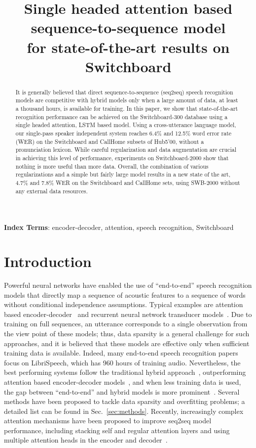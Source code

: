 \documentclass[a4paper]{article}
\title{Single headed attention based sequence-to-sequence model \\ for state-of-the-art results on Switchboard}
\begin{document}
\renewcommand{\baselinestretch}{0.933}\normalsize
\maketitle


\begin{abstract}
It is generally believed that direct sequence-to-sequence (seq2seq) speech recognition models are competitive with hybrid models only when a large amount of data, at least a thousand hours, is available for training.
In this paper, we show that state-of-the-art recognition performance can be achieved on the Switchboard-300 database using a single headed attention, LSTM based model.
Using a cross-utterance language model, our single-pass speaker independent system reaches 6.4\% and 12.5\% word error rate (WER) on the Switchboard and CallHome subsets of Hub5'00, without a pronunciation lexicon.
While careful regularization and data augmentation are crucial in achieving this level of performance, experiments on Switchboard-2000 show that nothing is more useful than more data.
Overall, the combination of various regularizations and a simple but fairly large model results in a new state of the art, 4.7\% and 7.8\% WER on the Switchboard and CallHome sets, using SWB-2000 without any external data resources.


\end{abstract}
\noindent\textbf{Index Terms}: encoder-decoder, attention, speech recognition, Switchboard




\section{Introduction}
\label{sec:intro}
Powerful neural networks have enabled the use of ``end-to-end'' speech recognition models that directly map a sequence of acoustic features to a sequence of words without conditional independence assumptions.
Typical examples are attention based encoder-decoder~\cite{Bahdanau2015} and recurrent neural network transducer models~\cite{Graves2012}.
Due to training on full sequences, an utterance corresponds to a single observation from the view point of these models; thus, data sparsity is a general challenge for such approaches, and it is believed that these models are effective only when sufficient training data is available.
Indeed, many end-to-end speech recognition papers focus on LibriSpeech, which has 960 hours of training audio.
Nevertheless, the best performing systems follow the traditional hybrid approach~\cite{Bourlard1993}, outperforming attention based encoder-decoder models~\cite{Park2019,Karita2019,Luscher2019,Wang2019}, and when less training data is used, the gap between ``end-to-end'' and hybrid models is more prominent~\cite{Park2019,Irie2019asru}.
Several methods have been proposed to tackle data sparsity and overfitting problems; a detailed list can be found in Sec.~\ref{sec:methods}.
Recently, increasingly complex attention mechanisms have been proposed to improve seq2seq model performance, including stacking self and regular attention layers and using multiple attention heads in the encoder and decoder~\cite{Karita2019,Vaswani2017}.
\end{document}
